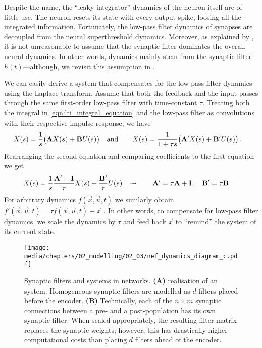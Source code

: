 Despite the name, the \enquote{leaky integrator} dynamics of the \LIF neuron itself are of little use.
The neuron resets its state with every output spike, loosing all the integrated information.
Fortunately, the low-pass filter dynamics of synapses are decoupled from the neural superthreshold dynamics.
Moreover, as explained by
\citet[Chapter~8 \& Appendix~F.1]{eliasmith2003neural},
it is not unreasonable to assume that the synaptic filter dominates the overall neural dynamics.
In other words, dynamics mainly stem from the synaptic filter $h(t)$---although, we revisit this assumption in .

We can easily derive a system that compensates for the low-pass filter dynamics using the Laplace transform.
Assume that both the feedback and the input passes through the same first-order low-pass filter with time-constant $\tau$.
Treating both the integral in \cref{eqn:lti_integral_equation} and the low-pass filter as convolutions with their respective impulse response, we have
\begin{align}
	X(s) &= \frac{1}{s} \bigl( \mathbf{A} X(s) + \mathbf{B} U(s) \bigr) & \text{and} \quad\quad X(s) &= \frac{1}{1 + \tau s} \bigl( \mathbf{A}' X(s) + \mathbf{B}' U(s) \bigr) \,.
	\label{eqn:original_vs_modified_lti}
\end{align}
Rearranging the second equation and comparing coefficients to the first equation we get
\begin{align}
	X(s) &= \frac{1}{s} \frac{\mathbf{A}' - \mathbf{I}}{\tau} X(s) + \frac{\mathbf{B}'}{\tau} U(s) &
	\leadsto \quad \quad \mathbf{A}' &= \tau \mathbf{A} + \mathbf{I} \,, &
	\mathbf{B}' &= \tau \mathbf{B} \,.
	\label{eqn:nef_transform_a_b}
\end{align}
For arbitrary dynamics $f(\vec x, \vec u, t)$ we similarly obtain $f'(\vec x, \vec u, t) = \tau f(\vec x, \vec u, t) + \vec x$ \citep[Appendix~B.3]{eliasmith2013how}.
In other words, to compensate for low-pass filter dynamics, we scale the dynamics by $\tau$ and feed back $\vec x$ to \enquote{remind} the system of its current state.

\begin{figure}
	\centering
	\texttt{[image: media/chapters/02\_modelling/02\_03/nef\_dynamics\_diagram\_c.pdf]}%
	{\label{fig:nef_dynamics_neurons_a}}%
	{\label{fig:nef_dynamics_neurons_b}}%
	\caption[Synaptic filters and LTI systems in NEF networks]{Synaptic filters and \LTI systems in \NEF networks.
	\textbf{(A)} \NEF realisation of an \LTI system. Homogeneous synaptic filters are modelled as $d$ filters placed before the encoder.
	\textbf{(B)} Technically, each of the $n \times m$ synaptic connections between a pre- and a post-population has its own synaptic filter. When scaled appropriately, the resulting filter matrix replaces the synaptic weights; however, this has drastically higher computational costs than placing $d$ filters ahead of the encoder.}
	\label{fig:nef_dynamics_neurons}
\end{figure}

